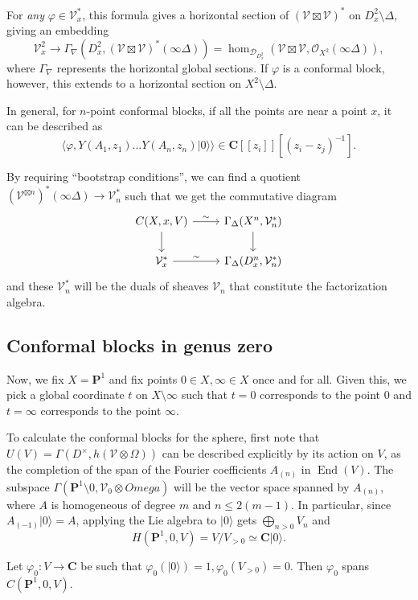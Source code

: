 \documentclass{article}
\newcommand{\CC}{\mathbold{C}}
\newcommand{\PP}{\mathbold{P}}
\newcommand{\vac}{|0\rangle}
\newcommand{\Oo}{\mathcal{O}}
\newcommand{\Dd}{\mathcal{D}}
\newcommand{\Vv}{\mathcal{V}}
\DeclareMathOperator{\End}{End}
\begin{document}
For \textit{any} $\varphi \in \Vv_x^*$, this formula gives a horizontal section of $(\Vv \boxtimes \Vv)^*$ on $D_x^2 \setminus \Delta$, giving an embedding
\[\Vv_x^2 \rightarrow \Gamma_\nabla(D_x^2,(\Vv \boxtimes \Vv)^*(\infty \Delta))=\hom_{\Dd_{D_x^2}}(\Vv \boxtimes \Vv,\Oo_{X^2}(\infty \Delta)), \]
where $\Gamma_\nabla$ represents the horizontal global sections.  If $\varphi$ is a conformal block, however, this extends to a horizontal section on $X^2 \setminus \Delta$.

In general, for $n$-point conformal blocks, if all the points are near a point $x$, it can be described as
\[\langle \varphi, Y(A_1,z_1)...Y(A_n,z_n)\vac \rangle \in \CC[[z_i]][(z_i-z_j)^{-1}]. \]

By requiring ``bootstrap conditions'', we can find a quotient $(\Vv^{\boxtimes n})^*(\infty \Delta) \rightarrow \Vv^*_n$ such that we get the commutative diagram
\[
  \begin{tikzcd}
    C(X,x,V) \arrow[r,"\sim"] \arrow[d] & \Gamma_\Delta(X^n,\Vv_n^*) \arrow[d]\\
    \Vv_x^* \arrow[r,"\sim"] & \Gamma_\Delta(D_x^n,\Vv_n^*)
  \end{tikzcd}
\]
and these $\Vv_n^*$ will be the duals of sheaves $\Vv_n$ that constitute the factorization algebra.

\subsection{Conformal blocks in genus zero}
Now, we fix $X=\PP^1$ and fix points $0 \in X, \infty \in X$ once and for all.  Given this, we pick a global coordinate $t$ on $X \setminus \infty$ such that $t=0$ corresponds to the point $0$ and $t=\infty$ corresponds to the point $\infty$.

To calculate the conformal blocks for the sphere, first note that $U(V)=\Gamma(D^\times,h(\Vv \otimes \Omega))$ can be described explicitly by its action on $V$, as the completion of the span of the Fourier coefficients $A_{(n)}$ in $\End(V)$.  The subspace $\Gamma(\PP^1 \setminus 0,\Vv_0 \otimes Omega)$ will be the vector space spanned by $A_{(n)}$, where $A$ is homogeneous of degree $m$ and $n \le 2(m-1)$.  In particular, since $A_{(-1)}\vac=A$, applying the Lie algebra to $\vac$ gets $\bigoplus_{n>0}V_n$ and
\[H(\PP^1,0,V)=V/V_{>0}\simeq \CC \vac. \]

Let $\varphi_0:V \rightarrow \CC$ be such that $\varphi_0(\vac)=1, \varphi_0(V_{>0})=0$.  Then $\varphi_0$ spans $C(\PP^1,0,V)$.
\end{document}
